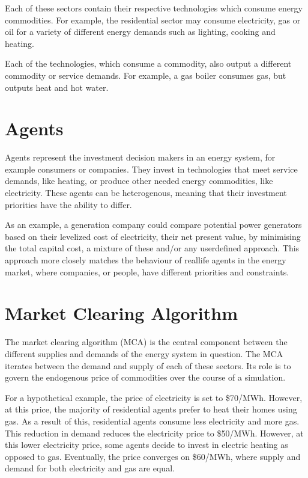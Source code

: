 \documentclass[letterpaper,10pt,english]{sphinxmanual}
\begin{document}
Each of these sectors contain their respective technologies which consume energy commodities. For example, the residential sector may consume electricity, gas or oil for a variety of different energy demands such as lighting, cooking and heating.

Each of the technologies, which consume a commodity, also output a different commodity or service demands. For example, a gas boiler consumes gas, but outputs heat and hot water.


\section{Agents}
\label{\detokenize{muse-components:agents}}
Agents represent the investment decision makers in an energy system, for example consumers or companies. They invest in technologies that meet service demands, like heating, or produce other needed energy commodities, like electricity. These agents can be heterogenous, meaning that their investment priorities have the ability to differ.

As an example, a generation company could compare potential power generators based on their levelized cost of electricity, their net present value, by minimising the total capital cost, a mixture of these and/or any user\sphinxhyphen{}defined approach. This approach more closely matches the behaviour of real\sphinxhyphen{}life agents in the energy market, where companies, or people, have different priorities and constraints.


\section{Market Clearing Algorithm}
\label{\detokenize{muse-components:market-clearing-algorithm}}
The market clearing algorithm (MCA) is the central component between the different supplies and demands of the energy system in question. The MCA iterates between the demand and supply of each of these sectors. Its role is to govern the endogenous price of commodities over the course of a simulation.

For a hypothetical example, the price of electricity is set to \$70/MWh. However, at this price, the majority of residential agents prefer to heat their homes using gas. As a result of this, residential agents consume less electricity and more gas. This reduction in demand reduces the electricity price to \$50/MWh. However, at this lower electricity price, some agents decide to invest in electric heating as opposed to gas. Eventually, the price converges on \$60/MWh, where supply and demand for both electricity and gas are equal.
\end{document}
